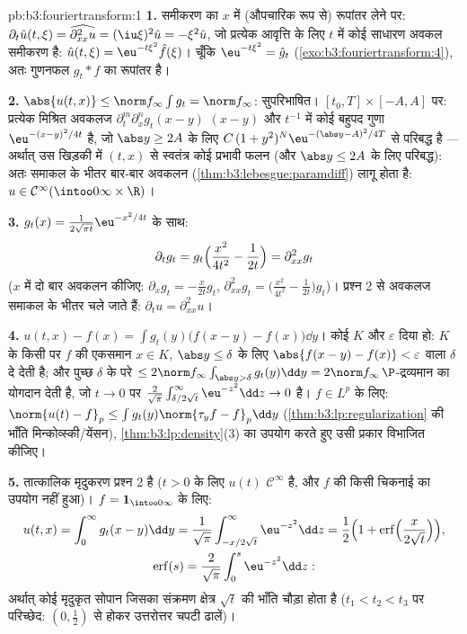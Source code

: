 \begin{solution}{pb:b3:fouriertransform:1}
\textbf{1.} समीकरण का $x$ में (औपचारिक रूप से) रूपांतर लेने पर:
$\partial_t\hat u(t,\xi) = \widehat{\partial^2_{xx}u} =
(\iu\xi)^2\hat u = -\xi^2\hat u$, जो प्रत्येक आवृत्ति के लिए $t$ में कोई साधारण अवकल समीकरण
है: $\hat u(t,\xi) = \eu^{-t\xi^2}\hat f(\xi)$। चूँकि $\eu^{-t\xi^2} = \hat g_t$ (\cref{exo:b3:fouriertransform:4}), अतः गुणनफल $g_t * f$ का रूपांतर है।

\textbf{2.} $\abs{u(t,x)} \leq \norm f_\infty\int g_t = \norm
f_\infty$: सुपरिभाषित। $[t_0, T]\times[-A, A]$ पर: प्रत्येक मिश्रित अवकलज
$\partial^m_t\partial^n_xg_t(x - y)$ $(x - y)$ और $t^{-1}$ में कोई बहुपद गुणा $\eu^{-(x-y)^2/4t}$ है, जो $\abs y \geq 2A$ के लिए
$C\,(1 + y^2)^N\eu^{-(\abs y - A)^2/4T}$ से परिबद्ध है --- अर्थात् उस खिड़की में $(t, x)$ से स्वतंत्र कोई
 प्रभावी फलन (और $\abs y \leq 2A$ के लिए परिबद्ध): अतः समाकल के भीतर
बार-बार अवकलन (\cref{thm:b3:lebesgue:paramdiff}) लागू होता है: $u \in
\mathcal C^\infty(\intoo0\infty\times\R)$।

\textbf{3.} $g_t(x) = \frac1{2\sqrt{\pi
t}}\eu^{-x^2/4t}$ के साथ:
\[
\partial_tg_t = g_t\Bigl(\frac{x^2}{4t^2} - \frac1{2t}\Bigr)
= \partial^2_{xx}g_t
\]
($x$ में दो बार अवकलन कीजिए: $\partial_xg_t = -\frac
x{2t}g_t$, $\partial^2_{xx}g_t = \bigl(\frac{x^2}{4t^2} -
\frac1{2t}\bigr)g_t$)। प्रश्न 2 से अवकलज
समाकल के भीतर चले जाते हैं: $\partial_tu = \partial^2_{xx}u$।

\textbf{4.} $u(t,x) - f(x) = \int g_t(y)\bigl(f(x - y) -
f(x)\bigr)\dd y$। कोई  $K$ और $\varepsilon$ दिया हो: $K$ के किसी
 पर $f$ की एकसमान  $x \in
K$, $\abs y \leq \delta$ के लिए $\abs{f(x-y) - f(x)} < \varepsilon$ वाला
$\delta$ दे देती है; और पुच्छ $\delta$ के परे $\leq 2\norm
f_\infty\int_{\abs y > \delta}g_t(y)\dd y = 2\norm
f_\infty\,\P$-द्रव्यमान का योगदान
देती है, जो $t \to 0$ पर $\frac2{\sqrt\pi}\int_{\delta/2\sqrt t}^\infty\eu^{-z^2}\dd z
\to 0$ है। $f \in L^p$ के लिए: $\norm{u(t) - f}_p \leq
\int g_t(y)\norm{\tau_yf - f}_p\dd y$ (\cref{thm:b3:lp:regularization} की भाँति
मिन्कोव्स्की/येंसन), \cref{thm:b3:lp:density}(3) का उपयोग करते हुए उसी प्रकार विभाजित
कीजिए।

\textbf{5.} तात्कालिक मृदुकरण प्रश्न 2 है ($t > 0$ के लिए $u(t)$ $\mathcal C^\infty$
है, और $f$ की किसी चिकनाई का उपयोग नहीं हुआ)। $f = \mathbf 1_{\intoo0\infty}$ के लिए:
\begin{gather*}
u(t, x) = \int_0^\infty g_t(x - y)\dd y
= \frac1{\sqrt\pi}\int_{-x/2\sqrt t}^{\infty}\eu^{-z^2}\dd z
= \frac12\Bigl(1 +
\operatorname{erf}\Bigl(\frac{x}{2\sqrt t}\Bigr)\Bigr), \\
\operatorname{erf}(s) =
\frac2{\sqrt\pi}\int_0^s\eu^{-z^2}\dd z :
\end{gather*}
अर्थात् कोई मृदुकृत सोपान जिसका संक्रमण क्षेत्र $\sqrt t$ की भाँति चौड़ा
होता है ($t_1 < t_2 < t_3$ पर परिच्छेद: $(0, \frac12)$ से होकर उत्तरोत्तर चपटी ढालें)।


\end{solution}

